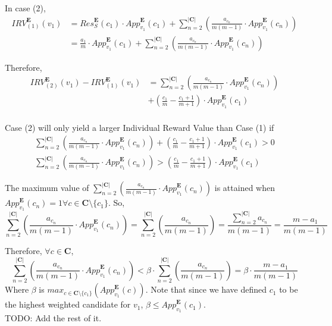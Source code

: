 \documentclass{article}
\begin{document}
In case (2), 
\begin{equation}
\begin{aligned}
{IRV}^{\pmb{E}}_{(1)}(v_1) 
&= {Res}^{\pmb{E}}_{S}(c_1)\cdot{App}^{\pmb{E}}_{v_1}(c_1) + \sum^{|\pmb{C}|}_{n = 2}{\left(\frac{a_{c_n}}{m(m-1)}\cdot{App}^{\pmb{E}}_{v_1}(c_{n})\right)}\\
&= \frac{a_1}{m}\cdot{App}^{\pmb{E}}_{v_1}(c_1) + \sum^{|\pmb{C}|}_{n = 2}{\left(\frac{a_{c_n}}{m(m-1)}\cdot{App}^{\pmb{E}}_{v_1}(c_{n})\right)}
\end{aligned}  
\end{equation}

Therefore,
\begin{equation}
\begin{aligned}
{IRV}^{\pmb{E}}_{(2)}(v_1) - {IRV}^{\pmb{E}}_{(1)}(v_1)
&=  \sum^{|\pmb{C}|}_{n = 2}{\left(\frac{a_{c_{n}}}{m(m-1)}\cdot{App}^{\pmb{E}}_{v_1}(c_{n})\right)}\\
&+ \left(\frac{c_{1}}{m}-\frac{c_{1}+1}{m+1}\right)\cdot{App}^{\pmb{E}}_{v_1}(c_{1})\\
\end{aligned}  
\end{equation}

Case (2) will only yield a larger Individual Reward Value than Case (1) if 
\begin{gather}
\sum^{|\pmb{C}|}_{n = 2}{\left(\frac{a_{c_{n}}}{m(m-1)}\cdot{App}^{\pmb{E}}_{v_1}(c_{n})\right)} + \left(\frac{c_{1}}{m}-\frac{c_{1}+1}{m+1}\right)\cdot{App}^{\pmb{E}}_{v_1}(c_{1}) > 0\nonumber\\
\sum^{|\pmb{C}|}_{n = 2}{\left(\frac{a_{c_{n}}}{m(m-1)}\cdot{App}^{\pmb{E}}_{v_1}(c_{n})\right)} > \left(\frac{c_{1}}{m}-\frac{c_{1}+1}{m+1}\right)\cdot{App}^{\pmb{E}}_{v_1}(c_{1})
\end{gather}

The maximum value of $\sum^{|\pmb{C}|}_{n = 2}{\left(\frac{a_{c_{n}}}{m(m-1)}\cdot{App}^{\pmb{E}}_{v_1}(c_{n})\right)}$ is attained when ${App}^{\pmb{E}}_{v_1}(c_{n}) = 1 \forall {c} \in \pmb{C} \setminus \{c_1\}$. So,
\begin{equation}
\sum^{|\pmb{C}|}_{n = 2}{\left(\frac{a_{c_{n}}}{m(m-1)}\cdot{App}^{\pmb{E}}_{v_1}(c_{n})\right)} = \sum^{|\pmb{C}|}_{n = 2}{\left(\frac{a_{c_{n}}}{m(m-1)}\right)} = \frac{\sum^{|\pmb{C}|}_{n = 2}{a_{c_{n}}}}{m(m-1)} = \frac{m-a_1}{m(m-1)}
\end{equation}

Therefore, $\forall {c} \in \pmb{C}$,
\begin{equation}
\sum^{|\pmb{C}|}_{n = 2}{\left(\frac{a_{c_{n}}}{m(m-1)}\cdot{App}^{\pmb{E}}_{v_1}(c_{n})\right)} < \beta\cdot\sum^{|\pmb{C}|}_{n = 2}{\left(\frac{a_{c_{n}}}{m(m-1)}\right)} = \beta\cdot\frac{m-a_1}{m(m-1)}
\end{equation}
Where $\beta$ is ${max}_{c \in \pmb{C} \setminus \{c_1\}}\left({App}^{\pmb{E}}_{v_1}(c)\right)$. Note that since we have defined $c_1$ to be the highest weighted candidate for $v_1$, $\beta \leq {App}^{\pmb{E}}_{v_1}(c_1)$.\\

TODO: Add the rest of it.
\end{document}
